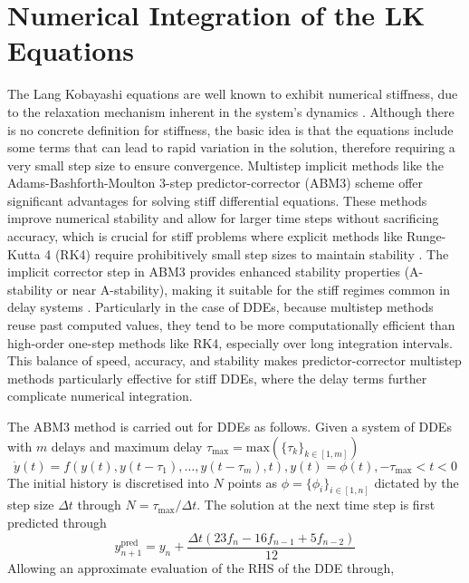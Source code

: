 \section{Numerical Integration of the LK Equations}
\label{app:integration}
%
The Lang Kobayashi equations are well known to exhibit numerical stiffness, due to the relaxation mechanism inherent in the system's dynamics \cite{pieroux2003low}. Although there is no concrete definition for stiffness, the basic idea is that the equations include some terms that can lead to rapid variation in the solution, therefore requiring a very small step size to ensure convergence. Multistep implicit methods like the Adams-Bashforth-Moulton 3-step predictor-corrector (ABM3) scheme offer significant advantages for solving stiff differential equations. These methods improve numerical stability and allow for larger time steps without sacrificing accuracy, which is crucial for stiff problems where explicit methods like Runge-Kutta 4 (RK4) require prohibitively small step sizes to maintain stability \cite{turner2001guide}. The implicit corrector step in ABM3 provides enhanced stability properties (A-stability or near A-stability), making it suitable for the stiff regimes common in delay systems \cite{suli2003introduction}. Particularly in the case of DDEs, because multistep methods reuse past computed values, they tend to be more computationally efficient than high-order one-step methods like RK4, especially over long integration intervals. This balance of speed, accuracy, and stability makes predictor-corrector multistep methods particularly effective for stiff DDEs, where the delay terms further complicate numerical integration.
%
\par
%
The ABM3 method is carried out for DDEs as follows. Given a system of DDEs with $m$ delays and maximum delay $\tau_\text{max} = \text{max}(\{\tau_k\}_{k\in[1,m]})$
%
\begin{equation*}
    \dot{y}(t) = f(y(t), y(t-\tau_1), \dots, y(t-\tau_m), t), y(t) = \phi(t), -\tau_\text{max} < t < 0
\end{equation*}
%
The initial history is discretised into $N$ points as $\phi = \{ \phi_i \}_{i \in [ 1, n ] }$ dictated by the step size $\Delta t$ through $N = \tau_\text{max} / \Delta t$. The solution at the next time step is first predicted through 
%
\begin{equation*}
    y_{n+1}^\text{pred} = y_n + \frac{\Delta t (23 f_n - 16 f_{n-1} + 5 f_{n-2})}{12}
\end{equation*}
%
Allowing an approximate evaluation of the RHS of the DDE through,
